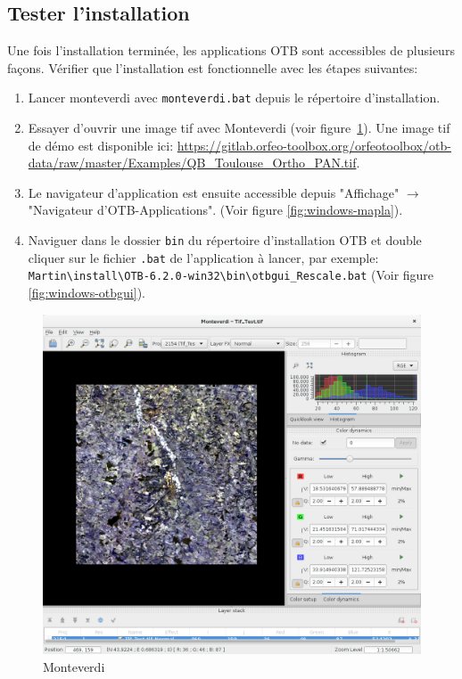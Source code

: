 \documentclass[10pt,a4paper]{article}
\begin{document}
\subsection{Tester l'installation}
Une fois l'installation terminée, les applications OTB sont accessibles de
plusieurs façons. Vérifier que l'installation est fonctionnelle avec les étapes
suivantes:
\begin{enumerate}

\item Lancer monteverdi avec \texttt{monteverdi.bat} depuis le répertoire
d'installation.

\item Essayer d'ouvrir une image tif avec Monteverdi (voir
figure~\ref{fig:monteverdi}). Une image tif de démo est
disponible ici: \url{https://gitlab.orfeo-toolbox.org/orfeotoolbox/otb-data/raw/master/Examples/QB\_Toulouse\_Ortho\_PAN.tif}.

\item Le navigateur d'application est ensuite accessible depuis "Affichage"
$\rightarrow$ "Navigateur d'OTB-Applications".
(Voir figure \ref{fig:windows-mapla}).

\item Naviguer dans le dossier \texttt{bin} du répertoire d'installation OTB et double cliquer sur le
fichier \texttt{.bat} de l'application à lancer, par exemple:\\
\texttt{Martin{\textbackslash}install{\textbackslash}OTB-6.2.0-win32{\textbackslash}bin{\textbackslash}otbgui\_Rescale.bat}
(Voir figure \ref{fig:windows-otbgui}).

\end{enumerate}

\begin{figure}[h]
  \center
  \includegraphics[width=1\textwidth]{Art/monteverdi-tif.png}
  \caption[]{Monteverdi}
  \label{fig:monteverdi}
\end{figure}
\end{document}
